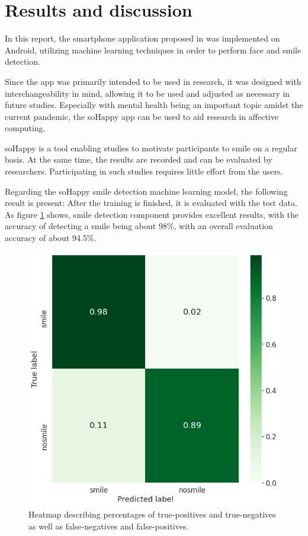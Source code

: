 \section{Results and discussion} \label{sec:results_and_discussion}

In this report, the smartphone application proposed in \cite{sohappy} was 
implemented on Android, utilizing machine learning techniques in order to 
perform face and smile detection.

Since the app was primarily intended to be used in research, it was designed
with interchangeability in mind, allowing it to be used and adjusted as 
necessary in future studies. Especially with mental health being an important
topic amidst the current pandemic, the soHappy app can be used to aid research 
in affective computing.

soHappy is a tool enabling studies to motivate participants to smile on a 
regular basis. At the same time, the results are recorded and can be evaluated 
by researchers. Participating in such studies requires little effort from the 
users.

Regarding the soHappy smile detection machine learning model, the following
result is present: After the training is finished, it is evaluated with the
test data. As figure \ref{fig:training_result} shows, smile detection component
provides excellent results, with the accuracy of detecting a
smile being about 98\%, with an overall evaluation accuracy of about 
94.5\%.

\begin{figure}
  \includegraphics[width=\linewidth]{figures/training_result.png}
  \caption{Heatmap describing percentages of true-positives and true-negatives as well as false-negatives and false-positives.}
  \label{fig:training_result}
\end{figure}

